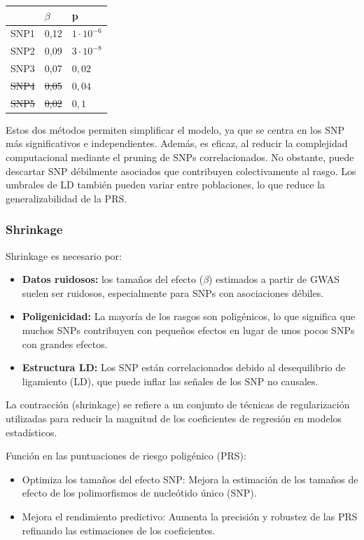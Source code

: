 \begin{table}[htbp]
\centering
\begin{tabular}{l l l}
& $\beta$ & p \\ \hline
SNP1 & 0,12 & $1 \cdot 10^{-6}$ \\
SNP2 & 0,09 & $3 \cdot 10^{-8}$ \\
SNP3 & 0,07 & $0,02$ \\
\st{SNP4} & \st{0,05} & \st{$0,04$} \\
\st{SNP5} & \st{0,02} & \st{$0,1$} \\
\end{tabular}
\end{table}
 
Estos dos métodos permiten simplificar el modelo, ya que se centra en los SNP más significativos e independientes. Además, es eficaz, al reducir la complejidad computacional mediante el pruning de SNPs correlacionados. No obstante, puede descartar SNP débilmente asociados que contribuyen colectivamente al rasgo. Los umbrales de LD también pueden variar entre poblaciones, lo que reduce la generalizabilidad de la PRS.
 
 \subsubsection{Shrinkage}
 Shrinkage es necesario por:
\begin{itemize}
\item \textbf{Datos ruidosos:} los tamaños del efecto ($\beta$) estimados a partir de GWAS suelen ser ruidosos, especialmente para SNPs con asociaciones débiles.
\item \textbf{Poligenicidad:} La mayoría de los rasgos son poligénicos, lo que significa que muchos SNPs contribuyen con pequeños efectos en lugar de unos pocos SNPs con grandes efectos.
\item \textbf{Estructura LD:} Los SNP están correlacionados debido al desequilibrio de ligamiento (LD), que puede inflar las señales de los SNP no causales.
\end{itemize}
 
La contracción (shrinkage) se refiere a un conjunto de técnicas de regularización utilizadas para reducir la magnitud de los coeficientes de regresión en modelos estadísticos. 

Función en las puntuaciones de riesgo poligénico (PRS):
\begin{itemize}
\item Optimiza los tamaños del efecto SNP: Mejora la estimación de los tamaños de efecto de los polimorfismos de nucleótido único (SNP).
\item Mejora el rendimiento predictivo: Aumenta la precisión y robustez de las PRS refinando las estimaciones de los coeficientes.
\end{itemize}


